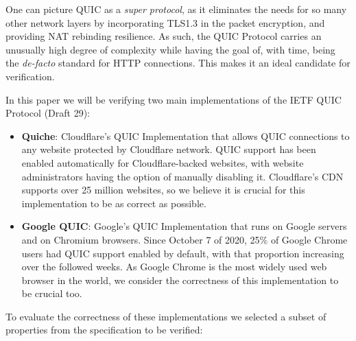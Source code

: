 \documentclass{article}
\begin{document}
One can picture QUIC as a \emph{super protocol}, as it eliminates the needs for so many other network layers by incorporating TLS1.3 in the packet encryption, and providing NAT rebinding resilience. As such, the QUIC Protocol carries an unusually high degree of complexity while having the goal of, with time, being the \emph{de-facto} standard for HTTP connections. This makes it an ideal candidate for verification. 

In this paper we will be verifying two main implementations of the IETF QUIC Protocol (Draft 29):
\begin{itemize}
    \item \textbf{Quiche}: Cloudflare's QUIC Implementation that allows QUIC connections to any website protected by Cloudflare network. QUIC support has been enabled automatically for Cloudflare-backed websites, with website administrators having the option of manually disabling it. Cloudflare's CDN supports over 25 million websites, so we believe it is crucial for this implementation to be as correct as possible.
    \item \textbf{Google QUIC}: Google's QUIC Implementation that runs on Google servers and on Chromium browsers. Since October 7 of 2020, 25\% of Google Chrome users had QUIC support enabled by default, with that proportion increasing over the followed weeks. As Google Chrome is the most widely used web browser in the world, we consider the correctness of this implementation to be crucial too.
\end{itemize}

To evaluate the correctness of these implementations we selected a subset of properties from the specification to be verified:
\end{document}
